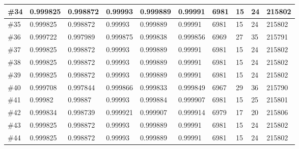 \begin{longtable}{l|l|l|l|l|l|l|l|l|l}
\#34 & 0.999825 & 0.998872 & 0.99993  & 0.999889 & 0.99991  & 6981 & 15 & 24  & 215802 \\ \hline
\#35 & 0.999825 & 0.998872 & 0.99993  & 0.999889 & 0.99991  & 6981 & 15 & 24  & 215802 \\ \hline
\#36 & 0.999722 & 0.997989 & 0.999875 & 0.999838 & 0.999856 & 6969 & 27 & 35  & 215791 \\ \hline
\#37 & 0.999825 & 0.998872 & 0.99993  & 0.999889 & 0.99991  & 6981 & 15 & 24  & 215802 \\ \hline
\#38 & 0.999825 & 0.998872 & 0.99993  & 0.999889 & 0.99991  & 6981 & 15 & 24  & 215802 \\ \hline
\#39 & 0.999825 & 0.998872 & 0.99993  & 0.999889 & 0.99991  & 6981 & 15 & 24  & 215802 \\ \hline
\#40 & 0.999708 & 0.997844 & 0.999866 & 0.999833 & 0.999849 & 6967 & 29 & 36  & 215790 \\ \hline
\#41 & 0.99982  & 0.99887  & 0.99993  & 0.999884 & 0.999907 & 6981 & 15 & 25  & 215801 \\ \hline
\#42 & 0.999834 & 0.998739 & 0.999921 & 0.999907 & 0.999914 & 6979 & 17 & 20  & 215806 \\ \hline
\#43 & 0.999825 & 0.998872 & 0.99993  & 0.999889 & 0.99991  & 6981 & 15 & 24  & 215802 \\ \hline
\#44 & 0.999825 & 0.998872 & 0.99993  & 0.999889 & 0.99991  & 6981 & 15 & 24  & 215802 \\ \hline



\end{longtable}





















